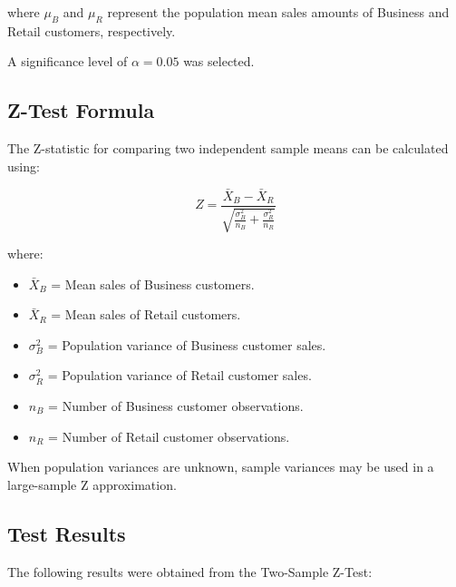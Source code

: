 \documentclass[12pt,a4paper]{report}
\begin{document}
where $\mu_B$ and $\mu_R$ represent
the population mean sales amounts
of Business and Retail customers,
respectively.

A significance level of
$\alpha = 0.05$ was selected.


\subsection{Z-Test Formula}

The Z-statistic for comparing two
independent sample means can be
calculated using:

\[
Z =
\frac{\bar{X}_B-\bar{X}_R}
{\sqrt{
\frac{\sigma_B^2}{n_B}
+
\frac{\sigma_R^2}{n_R}
}}
\]

where:

\begin{itemize}

    \item $\bar{X}_B$ = Mean sales of
    Business customers.

    \item $\bar{X}_R$ = Mean sales of
    Retail customers.

    \item $\sigma_B^2$ = Population
    variance of Business customer sales.

    \item $\sigma_R^2$ = Population
    variance of Retail customer sales.

    \item $n_B$ = Number of Business
    customer observations.

    \item $n_R$ = Number of Retail
    customer observations.

\end{itemize}

When population variances are unknown,
sample variances may be used in a
large-sample Z approximation.


\subsection{Test Results}

The following results were obtained
from the Two-Sample Z-Test:
\end{document}
